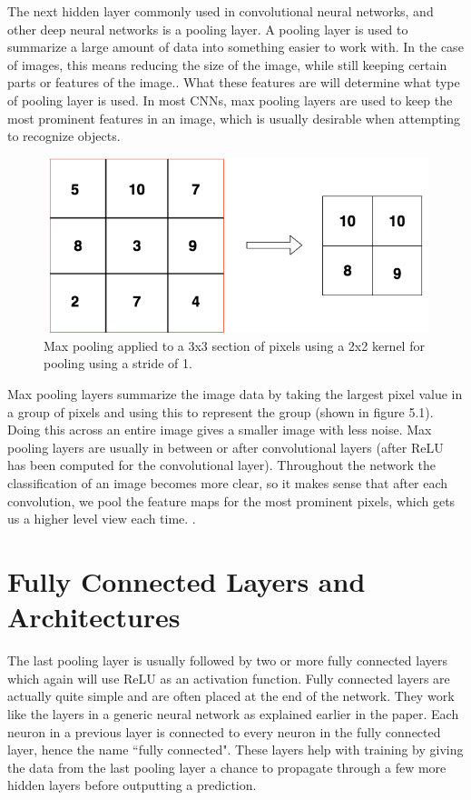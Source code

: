 \documentclass[12pt]{report} %
\begin{document}
	The next hidden layer commonly used in convolutional neural networks, and other deep neural networks is a pooling layer. A pooling layer is used to summarize a large amount of data into something easier to work with. In the case of images, this means reducing the size of the image, while still keeping certain parts or features of the image.\cite{aurelienMachineLearning}. What these features are will determine what type of pooling layer is used. In most CNNs, max pooling layers are used to keep the most prominent features in an image, which is usually desirable when attempting to recognize objects. 
\begin{figure}
\centering
\includegraphics[width=5in]{max_pooling}
\caption[Max Pooling Example]
	{Max pooling applied to a 3x3 section of pixels using a 2x2 kernel for pooling using a stride of 1.}
\end{figure}		
	Max pooling layers summarize the image data by taking the largest pixel value in a group of pixels and using this to represent the group (shown in figure 5.1). Doing this across an entire image gives a smaller image with less noise. Max pooling layers are usually in between or after convolutional layers (after ReLU has been computed for the convolutional layer). Throughout the network the classification of an image becomes more clear, so it makes sense that after each convolution, we pool the feature maps for the most prominent pixels, which gets us a higher level view each time. . 

 \section{Fully Connected Layers and Architectures}
	
	The last pooling layer is usually followed by two or more fully connected layers which again will use ReLU as an activation function. Fully connected layers are actually quite simple and are often placed at the end of the network. They work like the layers in a generic neural network as explained earlier in the paper. Each neuron in a previous layer is connected to every neuron in the fully connected layer, hence the name ``fully connected"\cite{LeonardoFully}. These layers help with training by giving the data from the last pooling layer a chance to propagate through a few more hidden layers before outputting a prediction. 
	
\end{document}
